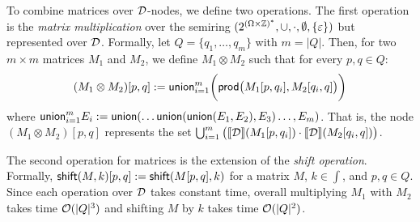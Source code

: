 To combine matrices over $\mathcal{D}$-nodes, we define two operations.
The first operation is the \emph{matrix multiplication} over the semiring $(2^{(\Omega\times \mathbb{Z})^*}, \cup, \cdot, \emptyset, \{\varepsilon\})$ but represented over $\mathcal{D}$. Formally, let $Q = \{q_1, \ldots, q_{m}\}$ with $m = |Q|$. Then, for two $m \times m$ matrices $M_1$ and $M_2$, we define $M_1 \otimes M_2$ such that for every $p,q \in Q$:
\[
(M_1 \otimes M_2)[p, q] := \mathsf{union}_{i=1}^{m} \bigg( \mathsf{prod}\big(M_1[p, q_i], M_2[q_i, q]\big) \bigg)
\]
where $\mathsf{union}_{i=1}^{m} E_i := \mathsf{union}(\ldots \mathsf{union}(\mathsf{union}(E_1, E_2), E_3)\ldots,E_m)$. 
That is, the node $(M_1 \otimes M_2)[p, q]$ represents the set $\bigcup_{i=1}^{m} \big( {\llbracket{\mathcal{D}}\rrbracket}(M_1[p, q_i]) \cdot {\llbracket{\mathcal{D}}\rrbracket}(M_2[q_i, q]) \big)$.%

The second operation for matrices is the extension of the \emph{shift operation}. Formally, $\mathsf{shift}(M,k)[p,q] := \mathsf{shift}(M[p,q], k)$ for a matrix $M$, $k \in \int$, and $p,q \in Q$.  
Since each operation over $\mathcal{D}$ takes constant time, overall multiplying $M_1$ with $M_2$ takes time $\mathcal{O}(|Q|^3)$ and shifting $M$ by $k$ takes time $\mathcal{O}(|Q|^2)$.

\let\oldReturn\Return
\renewcommand{\Return}{\State\oldReturn}
\newcommand{\lenx}{\operatorname{len}}

